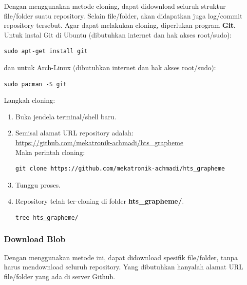 \documentclass[12pt,]{article}
\begin{document}
	Dengan menggunakan metode cloning, dapat didownload seluruh struktur file/folder suatu repository.
	Selain file/folder, akan didapatkan juga log/commit repository tersebut.
	Agar dapat melakukan cloning, diperlukan program \textbf{Git}.
	Untuk instal Git di Ubuntu (dibutuhkan internet dan hak akses root/sudo):
	\begin{verbatim}
sudo apt-get install git
	\end{verbatim}

	dan untuk Arch-Linux (dibutuhkan internet dan hak akses root/sudo):
	\begin{verbatim}
sudo pacman -S git
	\end{verbatim}

	Langkah cloning:
	\begin{enumerate}
		\item Buka jendela terminal/shell baru.

		\item Semisal alamat URL repository adalah:\\
		\url{https://github.com/mekatronik-achmadi/hts_grapheme} \\
		Maka perintah cloning:
		\begin{verbatim}
git clone https://github.com/mekatronik-achmadi/hts_grapheme
		\end{verbatim}

		\item Tunggu proses.

		\item Repository telah ter-cloning di folder \textbf{hts\_grapheme/}.
		\begin{verbatim}
tree hts_grapheme/
		\end{verbatim}

	\end{enumerate}

	\newpage
	\subsubsection{Download Blob}

	Dengan menggunakan metode ini, dapat didownload spesifik file/folder,
	tanpa harus mendownload seluruh repository.
	Yang dibutuhkan hanyalah alamat URL file/folder yang ada di server Github.
\end{document}
